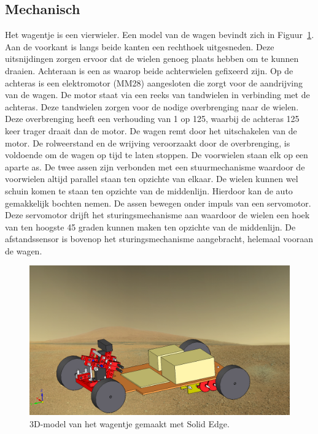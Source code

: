  
\subsection{Mechanisch}
Het wagentje is een vierwieler. Een model van de wagen bevindt zich in Figuur~\ref{image:auto-resultaat}. Aan de voorkant is langs beide kanten een 
rechthoek uitgesneden. Deze uitsnijdingen zorgen ervoor dat de wielen genoeg 
plaats hebben om te kunnen draaien. Achteraan is een as waarop beide 
achterwielen gefixeerd zijn. 
Op de achteras is een elektromotor (MM28) aangesloten die zorgt voor de 
aandrijving van de wagen. De motor staat via een reeks van tandwielen in 
verbinding met de achteras. Deze tandwielen zorgen voor de nodige overbrenging 
naar de wielen. Deze overbrenging heeft een verhouding van 1 op 125, waarbij de 
achteras 125 keer trager draait dan de motor.  De wagen remt door het 
uitschakelen van de motor. De rolweerstand en de wrijving veroorzaakt door de 
overbrenging, is voldoende om de wagen op tijd te laten stoppen.
De voorwielen staan elk op een aparte as. De twee assen zijn verbonden met een 
stuurmechanisme waardoor de voorwielen altijd parallel staan ten opzichte van 
elkaar. De wielen kunnen wel schuin komen te staan ten opzichte van de 
middenlijn. Hierdoor kan de auto gemakkelijk bochten nemen. De assen bewegen 
onder impuls van een servomotor. Deze servomotor drijft het sturingsmechanisme 
aan waardoor de wielen een hoek van ten hoogste 45 graden kunnen maken ten 
opzichte van de middenlijn. De afstandssensor is bovenop het sturingsmechanisme 
aangebracht, helemaal vooraan de wagen.
\begin{figure}
 \centering
 \includegraphics[width=\linewidth]{conceptkeuze-ontwerp/mechanisch/auto-resultaat.png}
 \caption{3D-model van het wagentje gemaakt met Solid Edge.}
 \label{image:auto-resultaat}
\end{figure}

